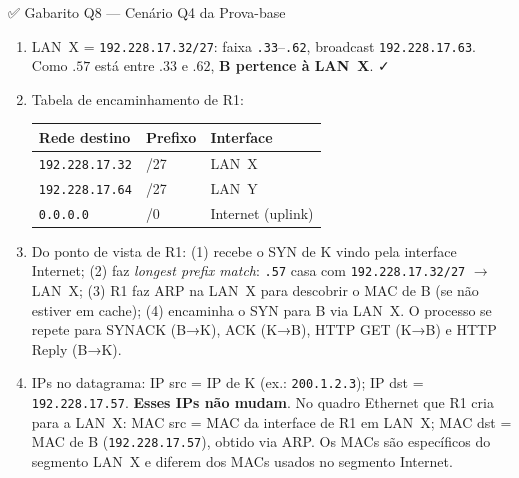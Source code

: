 \documentclass[11pt,a4paper]{article}
\begin{document}
\begin{gabaritocaixa}{✅ Gabarito Q8 --- Cenário Q4 da Prova-base}
\begin{enumerate}[label=(\alph*)]
    \item LAN~X = \texttt{192.228.17.32/27}: faixa \texttt{.33}--\texttt{.62}, broadcast \texttt{192.228.17.63}. Como $.57$ está entre $.33$ e $.62$, \textbf{B pertence à LAN~X}. ✓
    \item Tabela de encaminhamento de R1:
\begin{center}
\begin{tabular}{lll}
\toprule
\textbf{Rede destino} & \textbf{Prefixo} & \textbf{Interface} \\
\midrule
\texttt{192.228.17.32} & /27 & LAN~X \\
\texttt{192.228.17.64} & /27 & LAN~Y \\
\texttt{0.0.0.0} & /0 & Internet (uplink) \\
\bottomrule
\end{tabular}
\end{center}
    \item Do ponto de vista de R1: (1) recebe o SYN de K vindo pela interface Internet; (2) faz \textit{longest prefix match}: \texttt{.57} casa com \texttt{192.228.17.32/27} $\to$ LAN~X; (3) R1 faz ARP na LAN~X para descobrir o MAC de B (se não estiver em cache); (4) encaminha o SYN para B via LAN~X. O processo se repete para SYNACK (B→K), ACK (K→B), HTTP GET (K→B) e HTTP Reply (B→K).
    \item IPs no datagrama: IP src = IP de K (ex.: \texttt{200.1.2.3}); IP dst = \texttt{192.228.17.57}. \textbf{Esses IPs não mudam}. No quadro Ethernet que R1 cria para a LAN~X: MAC src = MAC da interface de R1 em LAN~X; MAC dst = MAC de B (\texttt{192.228.17.57}), obtido via ARP. Os MACs são específicos do segmento LAN~X e diferem dos MACs usados no segmento Internet.
\end{enumerate}
\end{gabaritocaixa}
\end{document}
